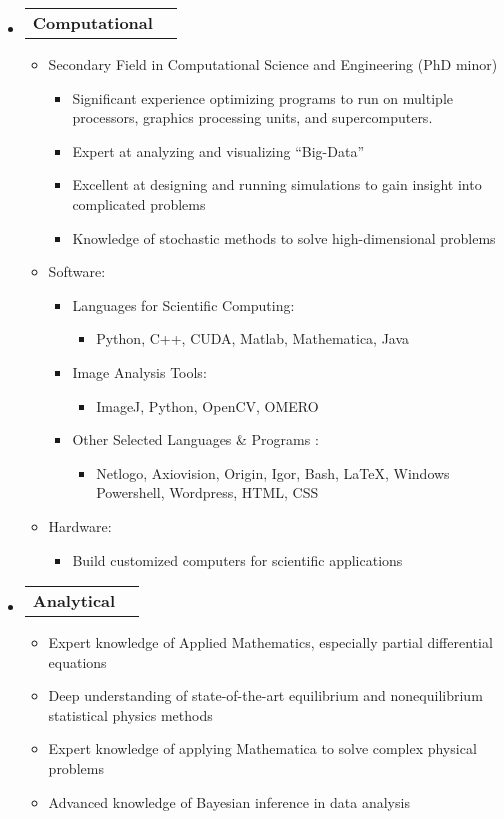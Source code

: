 \documentclass[letterpaper,11pt]{article}
\makeatletter
\newcommand{\resitem}[1]{\item #1 \vspace{-2pt}}
\newcommand{\award}[2]{\vspace{-5pt}
\begin{tabular*}{7.0in}{l@{\extracolsep{\fill}}r}
		\textbf{#1} & #2 
\end{tabular*}\vspace{-8pt}}
\makeatother
\begin{document}
\begin{itemize}

\item \award{Computational}{}

\begin{itemize}

\resitem{Secondary Field in Computational Science and Engineering (PhD minor)}
	\begin{itemize}
	\resitem{Significant experience optimizing programs to run on multiple processors, graphics processing units, and supercomputers.}
	\resitem{Expert at analyzing and visualizing ``Big-Data''}
	\resitem{Excellent at designing and running simulations to gain insight into complicated problems}
	\resitem{Knowledge of stochastic methods to solve high-dimensional problems}
	\end{itemize}

\resitem{Software:}

\begin{itemize}

	\resitem{Languages for Scientific Computing:} 
		\begin{itemize}
		\resitem{Python, C++, CUDA, Matlab, Mathematica, Java}
		\end{itemize}
		
	\resitem{Image Analysis Tools:}
		\begin{itemize}
		\resitem{ImageJ, Python, OpenCV, OMERO}
		\end{itemize}
	
	\resitem{Other Selected Languages \& Programs}:
		\begin{itemize}
		\resitem{Netlogo, Axiovision, Origin, Igor, Bash, \LaTeX, Windows Powershell, Wordpress, HTML, CSS}
		\end{itemize}
	
\end{itemize}

\resitem{Hardware:} 
	\begin{itemize}
	\resitem{Build customized computers for scientific applications}
	\end{itemize}

\end{itemize}

\item \award{Analytical}{}
\begin{itemize}
	\resitem{Expert knowledge of Applied Mathematics, especially partial differential equations}
	\resitem{Deep understanding of state-of-the-art equilibrium and nonequilibrium statistical physics methods}
	\resitem{Expert knowledge of applying Mathematica to solve complex physical problems}
	\resitem{Advanced knowledge of Bayesian inference in data analysis}
\end{itemize}




\end{itemize}
\end{document}
